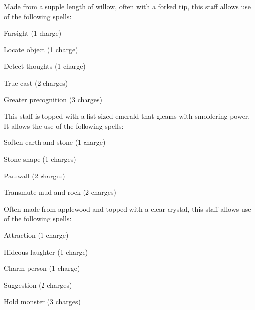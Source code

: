 
 Made from a supple length of willow, often with a forked tip, this staff allows use of the following spells:
\begin{itemize*}
\item Farsight (1 charge)
\item Locate object (1 charge)
\item Detect thoughts (1 charge)
\item True cast (2 charges)
\item Greater precognition (3 charges)
\end{itemize*}


 This staff is topped with a fist-sized emerald that gleams with smoldering power. It allows the use of the following spells:
\begin{itemize*}
\item Soften earth and stone (1 charge)
\item Stone shape (1 charges)
\item Passwall (2 charges)
\item Transmute mud and rock (2 charges)
\end{itemize*}


 Often made from applewood and topped with a clear crystal, this staff allows use of the following spells:
\begin{itemize*}
\item Attraction (1 charge)
\item Hideous laughter (1 charge)
\item Charm person (1 charge)
\item Suggestion (2 charges)
\item Hold monster (3 charges)
\end{itemize*}


